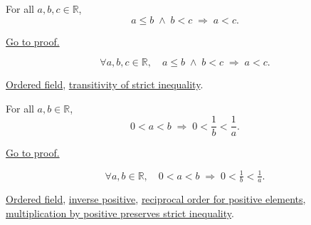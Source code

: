 \begin{theorem}
\label{thm:ineq-transitivity-mixed}
For all $a, b, c \in \mathbb{R}$,
\[
  a \le b \;\land\; b < c \;\Rightarrow\; a < c.
\]
\end{theorem}



\begin{remark*}[Proof]
\hyperref[prf:ineq-transitivity-mixed]{Go to proof.}
\end{remark*}

\begin{remark*}
\[
  \forall a, b, c \in \mathbb{R},\quad
  a \le b \;\land\; b < c \;\Rightarrow\; a < c.
\]
\end{remark*}

\begin{dependencies}
\hyperref[def:real-ordered-field]{Ordered field},
\hyperref[thm:ineq-transitivity-strict]{transitivity of strict inequality}.
\end{dependencies}


\begin{theorem}
\label{thm:ineq-reciprocal-positive}
For all $a, b \in \mathbb{R}$,
\[
  0 < a < b \;\Rightarrow\; 0 < \frac{1}{b} < \frac{1}{a}.
\]
\end{theorem}



\begin{remark*}[Proof]
\hyperref[prf:ineq-reciprocal-positive]{Go to proof.}
\end{remark*}

\begin{remark*}
\[
  \forall a, b \in \mathbb{R},\quad
  0 < a < b \;\Rightarrow\;
  0 < \tfrac{1}{b} < \tfrac{1}{a}.
\]
\end{remark*}

\begin{dependencies}
\hyperref[def:real-ordered-field]{Ordered field},
\hyperref[thm:ordered-field-positive-inverses]{inverse positive},
\hyperref[thm:reciprocal-reverses-order-on-positives-q]{reciprocal order for positive elements},
\hyperref[thm:ineq-multiply-positive]{multiplication by positive preserves strict inequality}.
\end{dependencies}

